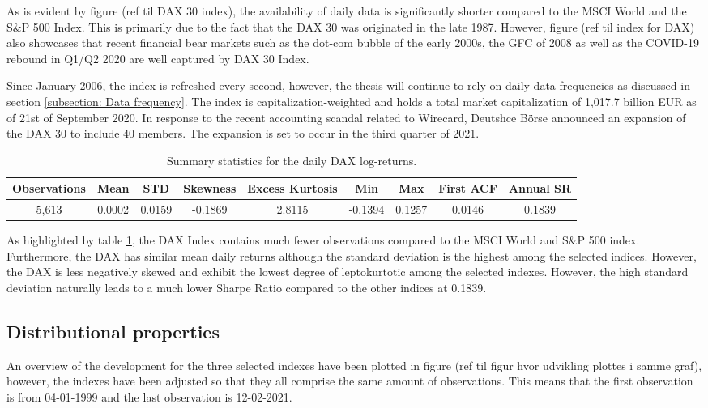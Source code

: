 
As is evident by figure (ref til DAX 30 index), the availability of daily data is significantly shorter compared to the MSCI World and the S\&P 500 Index. This is primarily due to the fact that the DAX 30 was originated in the late 1987. However, figure (ref til index for DAX) also showcases that recent financial bear markets such as the dot-com bubble of the early 2000s, the GFC of 2008 as well as the COVID-19 rebound in Q1/Q2 2020 are well captured by DAX 30 Index. 

Since January 2006, the index is refreshed every second, however, the thesis will continue to rely on daily data frequencies as discussed in section \ref{subsection: Data frequency}. The index is capitalization-weighted and holds a total market capitalization of 1,017.7 billion EUR as of 21st of September 2020. In response to the recent accounting scandal related to Wirecard, Deutshce Börse announced an expansion of the DAX 30 to include 40 members. The expansion is set to occur in the third quarter of 2021.

\begin{table}[H]
\caption{Summary statistics for the daily DAX log-returns.}
\centering
\begin{tabular}{c c c c c c c c c} 
\hline\hline
Observations & Mean & STD & Skewness & Excess Kurtosis & Min & Max & First ACF & Annual SR \\
\hline
5,613 & 0.0002 & 0.0159 & -0.1869 & 2.8115 & -0.1394 & 0.1257 & 0.0146 & 0.1839 \\
\hline
\end{tabular}
\label{tab:summary_stats_DAX}
\end{table}

As highlighted by table \ref{tab:summary_stats_DAX}, the DAX Index contains much fewer observations compared to the MSCI World and S\&P 500 index. Furthermore, the DAX has similar mean daily returns although the standard deviation is the highest among the selected indices. However, the DAX is less negatively skewed and exhibit the lowest degree of leptokurtotic among the selected indexes. However, the high standard deviation naturally leads to a much lower Sharpe Ratio compared to the other indices at 0.1839.

\subsection{Distributional properties}
An overview of the development for the three selected indexes have been plotted in figure (ref til figur hvor udvikling plottes i samme graf), however, the indexes have been adjusted so that they all comprise the same amount of observations. This means that the first observation is from 04-01-1999 and the last observation is 12-02-2021. 


